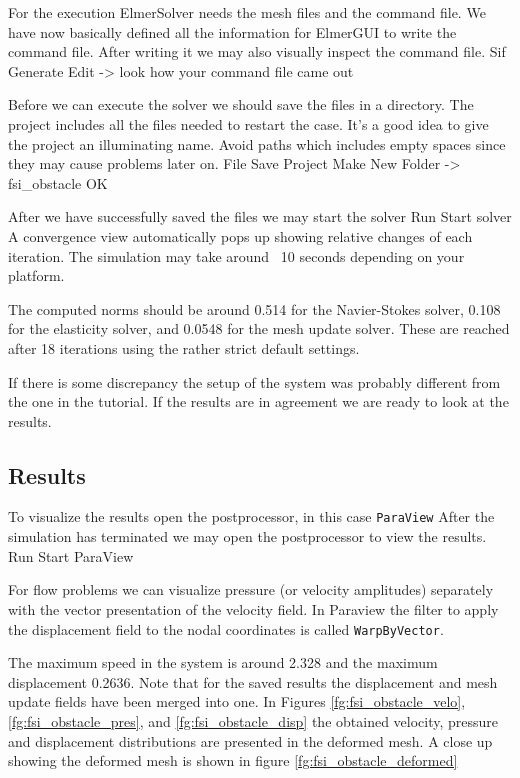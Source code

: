 For the execution 
ElmerSolver needs the mesh files and the command file. We have now basically defined
all the information for ElmerGUI to write the command file. After writing it we may also visually 
inspect the command file.
\ttbegin
Sif 
  Generate
  Edit -> look how your command file came out  
\ttend

Before we can execute the solver we should save the files in a directory. The project includes
all the files needed to restart the case. It's a good idea to give the project an illuminating name.
Avoid paths which includes empty spaces since they may cause problems later on. 
\ttbegin
File 
  Save Project
    Make New Folder -> fsi_obstacle
    OK
\ttend

After we have successfully saved the files we may start the solver
\ttbegin
Run
  Start solver
\ttend
A convergence view automatically pops up showing relative changes of each iteration.
The simulation may take around ~10 seconds depending on your platform. 

The computed norms should be around 0.514 for the Navier-Stokes solver, 0.108 for the elasticity solver,
and 0.0548 for the mesh update solver. These are reached after 18 iterations using the rather strict default settings.

If there is some discrepancy the setup of the system
was probably different from the one in the tutorial.
If the results are in agreement we are ready to look at the results.

\subsection*{Results}

To visualize the results open the postprocessor, in this case \texttt{ParaView}
After the simulation has terminated we may open the postprocessor to view the results.
\ttbegin
Run
  Start ParaView
\ttend

For flow problems we can visualize pressure (or velocity amplitudes) separately with the vector presentation
of the velocity field. In Paraview the filter to apply the displacement field to the nodal coordinates is
called \texttt{WarpByVector}.

The maximum speed in the system is around 2.328 and the maximum displacement 0.2636. Note that 
for the saved results the displacement and mesh update fields have been merged into one. 
In Figures \ref{fg:fsi_obstacle_velo}, \ref{fg:fsi_obstacle_pres}, and
\ref{fg:fsi_obstacle_disp}
the obtained velocity, pressure and displacement 
distributions are presented in the deformed mesh.  A close up showing the deformed mesh is shown
in figure  \ref{fg:fsi_obstacle_deformed}
 
